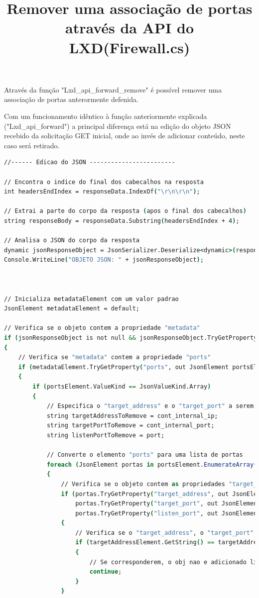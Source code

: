 \title*{\textbf{Remover uma associação de portas através da API do LXD(Firewall.cs)}}

Através da função "Lxd\_api\_forward\_remove" é possível remover uma associação de portas
anterormente defenida.


Com um funcionamento idêntico à função anteriormente explicada ("Lxd\_api\_forward")
a principal diferença está na edição do objeto JSON recebido da solicitação GET inicial,
onde ao invés de adicionar conteúdo, neste caso será retirado.


\begin{lstlisting}[language=csh, caption={Edição do objeto Json "ports" para remover contúdo especificado}]
//------ Edicao do JSON ------------------------

// Encontra o indice do final dos cabecalhos na resposta
int headersEndIndex = responseData.IndexOf("\r\n\r\n");

// Extrai a parte do corpo da resposta (apos o final dos cabecalhos)
string responseBody = responseData.Substring(headersEndIndex + 4);

// Analisa o JSON do corpo da resposta
dynamic jsonResponseObject = JsonSerializer.Deserialize<dynamic>(responseBody);
Console.WriteLine("OBJETO JSON: " + jsonResponseObject);



// Inicializa metadataElement com um valor padrao
JsonElement metadataElement = default;

// Verifica se o objeto contem a propriedade "metadata"
if (jsonResponseObject is not null && jsonResponseObject.TryGetProperty("metadata", out metadataElement))
{
    // Verifica se "metadata" contem a propriedade "ports"
    if (metadataElement.TryGetProperty("ports", out JsonElement portsElement))
    {
        if (portsElement.ValueKind == JsonValueKind.Array)
        {
            // Especifica o "target_address" e o "target_port" a serem removidos
            string targetAddressToRemove = cont_internal_ip;
            string targetPortToRemove = cont_internal_port;
            string listenPortToRemove = port;

            // Converte o elemento "ports" para uma lista de portas
            foreach (JsonElement portas in portsElement.EnumerateArray())
            {
                // Verifica se o objeto contem as propriedades "target_address" e "target_port" e "listen_port"
                if (portas.TryGetProperty("target_address", out JsonElement targetAddressElement) &&
                    portas.TryGetProperty("target_port", out JsonElement targetPortElement) &&
                    portas.TryGetProperty("listen_port", out JsonElement listenPortElement))
                {
                    // Verifica se o "target_address", o "target_port" e o "listen_port" correspondem aos especificados
                    if (targetAddressElement.GetString() == targetAddressToRemove && targetPortElement.GetString() == targetPortToRemove && listenPortElement.GetString() == listenPortToRemove)
                    {
                        // Se corresponderem, o obj nao e adicionado lista de portas
                        continue;
                    }
                }


\end{lstlisting}
